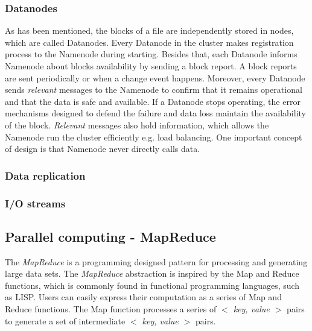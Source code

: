 \documentclass[a4paper,12pt,oneside]{report}
\begin{document}
		\subsubsection{Datanodes}
As has been mentioned, the blocks of a file are independently stored in nodes, which are called
Datanodes. Every Datanode in the cluster makes registration process to the Namenode during starting. Besides that, each Datanode informs Namenode about blocks availability by sending a block report. A block reports are sent periodically or when a change event
happens. Moreover, every Datanode sends \emph{relevant} messages to the Namenode to confirm that
it remains operational and that the data is safe and available. If a Datanode stops operating, the error mechanisms designed to defend the failure and data loss maintain the availability of the block.
\emph{Relevant} messages also hold information, which allows the Namenode run the cluster efficiently e.g. load balancing.  One   important concept of design  is that Namenode never directly calls data.
		
		
		\subsubsection*{Data replication}
		\subsubsection*{I/O streams}

		
	\subsection{Parallel computing - MapReduce}		

The \emph{MapReduce} is a programming designed pattern for processing and generating large data
sets. The \emph{MapReduce} abstraction is inspired by the Map and Reduce functions, which is commonly
found in functional programming languages, such as LISP. Users can easily express their
computation as a series of Map and Reduce functions. The Map function processes a series of
\textit{$<$ key, value $>$} pairs to generate a set of intermediate \textit{$<$ key, value $>$} pairs.
\end{document}
